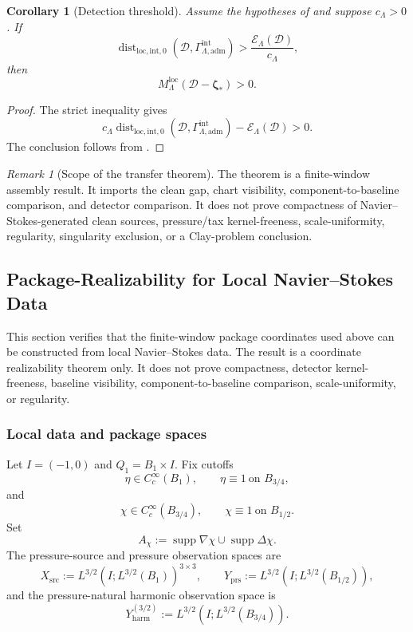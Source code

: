 \documentclass[11pt]{article}
\numberwithin{equation}{section}
\newtheorem{corollary}[corollary]{Corollary}
\theoremstyle{definition}
\theoremstyle{remark}
\newtheorem{remark}[remark]{Remark}
\newcommand{\loc}{\mathrm{loc}}
\newcommand{\adm}{\mathrm{adm}}
\newcommand{\src}{\mathrm{src}}
\newcommand{\Dist}{\operatorname{dist}}
\newcommand{\calD}{\mathcal D}
\newcommand{\bzeta}{\boldsymbol\zeta}
\begin{document}
\begin{corollary}[Detection threshold]
\label{cor:local-to-clean-threshold}
Assume the hypotheses of  and suppose
\(c_{\Lambda}>0\).  If
\[
    \Dist_{\loc,\mathrm{int},0}
    (\calD,\Gamma_{\Lambda,\adm}^{\mathrm{int}})
    >
    \frac{\mathcal E_{\Lambda}(\calD)}{c_{\Lambda}},
\]
then
\[
    M_{\Lambda}^{\loc}(\calD-\bzeta_*)>0.
\]
\end{corollary}

\begin{proof}
The strict inequality gives
\[
    c_{\Lambda}
    \Dist_{\loc,\mathrm{int},0}
    (\calD,\Gamma_{\Lambda,\adm}^{\mathrm{int}})
    -
    \mathcal E_{\Lambda}(\calD)
    >
    0.
\]
The conclusion follows from .
\end{proof}

\begin{remark}[Scope of the transfer theorem]
The theorem is a finite-window assembly result.  It imports the clean gap,
chart visibility, component-to-baseline comparison, and detector comparison. It
does not prove compactness of Navier--Stokes-generated clean sources,
pressure/tax kernel-freeness, scale-uniformity, regularity, singularity
exclusion, or a Clay-problem conclusion.
\end{remark}

\subsection{Package-Realizability for Local Navier--Stokes Data}
\label{sec:realizability}

This section verifies that the finite-window package coordinates used above can
be constructed from local Navier--Stokes data.  The result is a coordinate
realizability theorem only.  It does not prove compactness, detector
kernel-freeness, baseline visibility, component-to-baseline comparison,
scale-uniformity, or regularity.

\subsubsection{Local data and package spaces}

Let \(I=(-1,0)\) and \(Q_1=B_1\times I\).  Fix cutoffs
\[
    \eta\in C_c^\infty(B_1),
    \qquad
    \eta\equiv1\ \text{on }B_{3/4},
\]
and
\[
    \chi\in C_c^\infty(B_{3/4}),
    \qquad
    \chi\equiv1\ \text{on }B_{1/2}.
\]
Set
\[
    A_\chi
    :=
    \operatorname{supp}\nabla\chi
    \cup
    \operatorname{supp}\Delta\chi.
\]
The pressure-source and pressure observation spaces are
\[
    X_{\src}
    :=
    L^{3/2}(I;L^{3/2}(B_1))^{3\times3},
    \qquad
    Y_{\mathrm{prs}}
    :=
    L^{3/2}(I;L^{3/2}(B_{1/2})),
\]
and the pressure-natural harmonic observation space is
\[
    Y_{\mathrm{harm}}^{(3/2)}
    :=
    L^{3/2}(I;L^{3/2}(B_{3/4})).
\]
\end{document}
